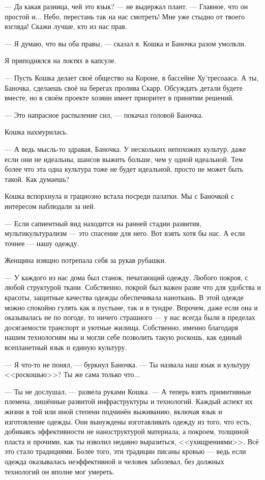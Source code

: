 --- Да какая разница, чей это язык? --- не выдержал плант.
--- Главное, что он простой и...
Небо, перестань так на нас смотреть!
Мне уже стыдно от твоего взгляда!
Скажи лучше, кто из нас прав.

--- Я думаю, что вы оба правы, --- сказал я.
Кошка и Баночка разом умолкли.

Я приподнялся на локтях в капсуле.

--- Пусть Кошка делает своё общество на Короне, в бассейне Ху'тресоааса.
А ты, Баночка, сделаешь своё на берегах пролива Скарр.
Обсуждать детали будете вместе, но в своём проекте хозяин имеет приоритет в принятии решений.

--- Это напрасное распыление сил, --- покачал головой Баночка.

Кошка нахмурилась.

--- А ведь мысль-то здравая, Баночка.
У нескольких непохожих культур, даже если они не идеальны, шансов выжить больше, чем у одной идеальной.
Тем более что эта одна культура тоже не будет идеальной, просто не может быть такой.
Как думаешь?

Кошка вспорхнула и грациозно встала посреди палатки.
Мы с Баночкой с интересом наблюдали за ней.

--- Если сапиентный вид находится на ранней стадии развития, мультикультурализм --- это спасение для него.
Вот взять хотя бы нас.
А если точнее --- нашу одежду.

Женщина изящно потрепала себя за рукав рубашки.

--- У каждого из нас дома был станок, печатающий одежду.
Любого покроя, с любой структурой ткани.
Собственно, покрой был важен разве что для удобства и красоты, защитные качества одежды обеспечивала наноткань.
В этой одежде можно спокойно гулять как в пустыне, так и в тундре.
Впрочем, даже если она и оказывалась не по погоде, то ничего страшного --- у нас всегда были в пределах досягаемости транспорт и уютные жилища.
Собственно, именно благодаря нашим технологиям мы и могли себе позволить такую роскошь, как единый всепланетный язык и единую культуру.

--- Я что-то не понял, --- буркнул Баночка.
--- Ты назвала наш язык и культуру <<роскошью>>?
Ты же сама только что...

--- Ты не дослушал, --- развела руками Кошка.
--- А теперь взять примитивные племена, лишённые развитой инфраструктуры и технологий.
Каждый аспект их жизни в той или иной степени подчинён выживанию, включая язык и изготовление одежды.
Они вынуждены изготавливать одежду из того, что есть, добиваясь эффективности не наноструктурой материала, а покроем, толщиной пласта и прочими, как ты изволил недавно выразиться, <<ухищрениями>>.
Всё это стало традициями.
Более того, эти традиции писаны кровью --- ведь если одежда оказывалась неэффективной и человек заболевал, без должных технологий он вполне мог умереть.

